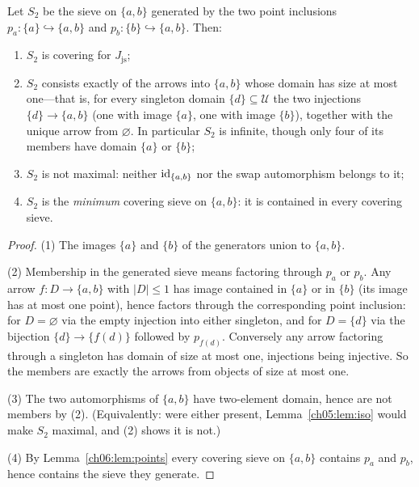 \begin{lemma}\label{ch06:lem:sieve}
Let $S_2$ be the sieve on $\{a,b\}$ generated by the two point inclusions
$p_a:\{a\}\hookrightarrow\{a,b\}$ and $p_b:\{b\}\hookrightarrow\{a,b\}$.
Then:
\begin{enumerate}
\item $S_2$ is covering for $J_{\mathrm{js}}$;
\item $S_2$ consists exactly of the arrows into $\{a,b\}$ whose domain has
size at most one---that is, for every singleton domain
$\{d\}\subseteq\mathcal{U}$ the two injections $\{d\}\to\{a,b\}$ (one with
image $\{a\}$, one with image $\{b\}$), together with the unique arrow from
$\varnothing$. In particular $S_2$ is infinite, though only four of its
members have domain $\{a\}$ or $\{b\}$;
\item $S_2$ is not maximal: neither $\mathrm{id}_{\{a,b\}}$ nor the swap
automorphism belongs to it;
\item $S_2$ is the \emph{minimum} covering sieve on $\{a,b\}$: it is
contained in every covering sieve.
\end{enumerate}
\end{lemma}

\begin{proof}
(1) The images $\{a\}$ and $\{b\}$ of the generators union to $\{a,b\}$.

(2) Membership in the generated sieve means factoring through $p_a$ or
$p_b$. Any arrow $f:D\to\{a,b\}$ with $|D|\le 1$ has image contained in
$\{a\}$ or in $\{b\}$ (its image has at most one point), hence factors
through the corresponding point inclusion: for $D=\varnothing$ via the empty
injection into either singleton, and for $D=\{d\}$ via the bijection
$\{d\}\to\{f(d)\}$ followed by $p_{f(d)}$. Conversely any arrow factoring
through a singleton has domain of size at most one, injections being
injective. So the members are exactly the arrows from objects of size at
most one.

(3) The two automorphisms of $\{a,b\}$ have two-element domain, hence are
not members by (2). (Equivalently: were either present,
Lemma~\ref{ch05:lem:iso} would make $S_2$ maximal, and (2) shows it is
not.)

(4) By Lemma~\ref{ch06:lem:points} every covering sieve on $\{a,b\}$
contains $p_a$ and $p_b$, hence contains the sieve they generate.
\end{proof}

